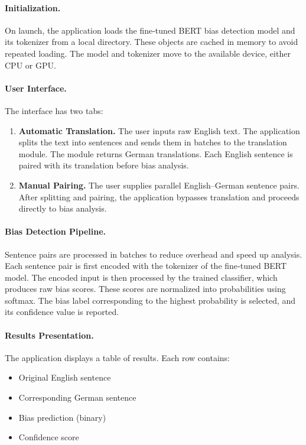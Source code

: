 \paragraph{Initialization.} 
On launch, the application loads the fine‑tuned BERT bias detection model and its tokenizer from a local directory. These objects are cached in memory to avoid repeated loading. The model and tokenizer move to the available device, either CPU or GPU.

\paragraph{User Interface.} 
The interface has two tabs:
\begin{enumerate}
  \item \textbf{Automatic Translation.} The user inputs raw English text. The application splits the text into sentences and sends them in batches to the translation module. The module returns German translations. Each English sentence is paired with its translation before bias analysis.
  \item \textbf{Manual Pairing.} The user supplies parallel English–German sentence pairs. After splitting and pairing, the application bypasses translation and proceeds directly to bias analysis.
\end{enumerate}

\paragraph{Bias Detection Pipeline.} 
Sentence pairs are processed in batches to reduce overhead and speed up analysis. Each sentence pair is first encoded with the tokenizer of the fine‑tuned BERT model. The encoded input is then processed by the trained classifier, which produces raw bias scores. These scores are normalized into probabilities using softmax. The bias label corresponding to the highest probability is selected, and its confidence value is reported.

\paragraph{Results Presentation.} 
The application displays a table of results. Each row contains:
\begin{itemize}
  \item Original English sentence
  \item Corresponding German sentence
  \item Bias prediction (binary)
  \item Confidence score
\end{itemize}

